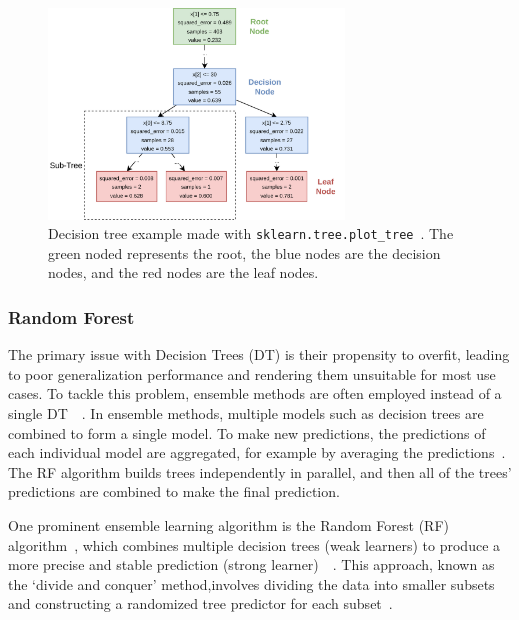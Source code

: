 \begin{figure}[h]
    \begin{tcolorbox}[arc=0pt,boxrule=0.5pt]
        \centering
        \includegraphics[width=0.7\textwidth]{chap4/images/decision_tree_example}
    \end{tcolorbox}
    \caption{Decision tree example made with \texttt{sklearn.tree.plot\_tree}~\cite{scikit-learn}.
    The green noded represents the root, the blue nodes are the decision nodes, and the red nodes are the leaf nodes.}
    \label{fig:dt-example}
\end{figure}

\subsubsection{Random Forest}\label{subsubsec:random-forests}
The primary issue with Decision Trees (\ac{DT}) is their propensity to overfit, leading to poor generalization
performance and rendering them unsuitable for most use cases.
To tackle this problem, ensemble methods are often employed instead of a single
DT~\cite[p. 78]{muller_introductionmachinelearning_2016}~\cite[p. 251]{liu_newmachinelearning_2012}.
In ensemble methods, multiple models such as decision trees are combined to form a single model. To make new
predictions, the predictions of each individual model are aggregated, for example by averaging the
predictions~\cite[p. 222]{boehmke2019hands}.
The RF algorithm builds trees independently in parallel, and then all of the trees' predictions are combined to make
the final prediction.

One prominent ensemble learning algorithm is the Random Forest
(\ac{RF}) algorithm~\cite[]{breiman_randomforests_2001}, which combines multiple decision trees (weak learners) to
produce a more precise and stable prediction
(strong learner)~\cite[p. 24]{awad_efficientlearningmachines_2015}~\cite[pp. 340]{gareth2013introduction}.
This approach, known as the `divide and conquer' method,involves dividing the data into smaller subsets and
constructing a randomized tree predictor for each subset~\cite[p. 251]{liu_newmachinelearning_2012}.

